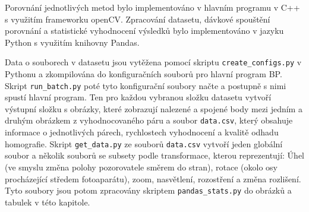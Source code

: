 
Porovnání jednotlivých metod bylo implementováno v hlavním programu v C++ s využitím frameworku
openCV. Zpracování datasetu, dávkové spouštění porovnání a statistické vyhodnocení výsledků bylo
implementováno v jazyku Python s využitím knihovny Pandas.


Data o souborech v datasetu jsou vytěžena pomocí skriptu \verb|create_configs.py| v Pythonu a zkompilována do konfiguračních souborů pro hlavní program BP. Skript \verb|run_batch.py| poté tyto konfigurační soubory načte a postupně s nimi spustí hlavní program. Ten pro každou vybranou složku datasetu vytvoří výstupní složku s obrázky, které zobrazují nalezené a spojené body mezi jedním a druhým obrázkem z vyhodnocovaného páru a soubor \verb|data.csv|, který obsahuje informace o jednotlivých párech, rychlostech vyhodnocení a kvalitě odhadu homografie. Skript \verb|get_data.py| ze souborů \verb|data.csv| vytvoří jeden globální soubor a několik souborů se subsety podle transformace, kterou reprezentují: Úhel (ve smyslu změna polohy pozorovatele směrem do stran), rotace (okolo osy procházející středem fotoaparátu), zoom, nasvětlení, rozostření a změna rozlišení. Tyto soubory jsou potom zpracovány skriptem \verb|pandas_stats.py| do obrázků a tabulek v této kapitole.

%
%
%

